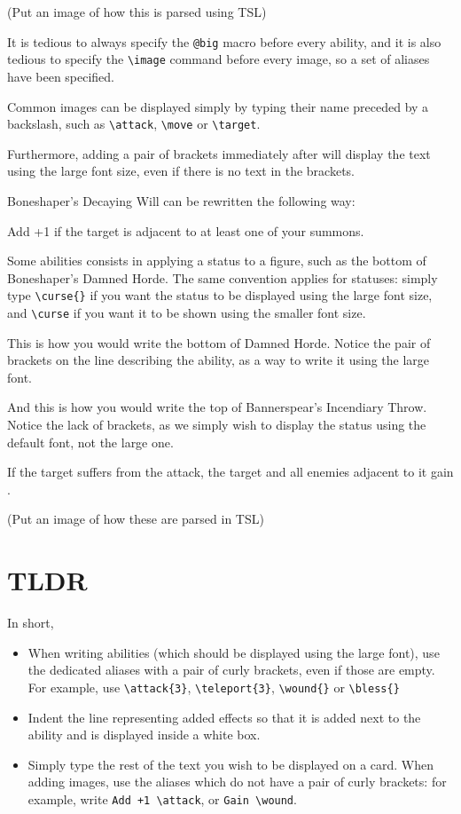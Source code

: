 \documentclass{article}
\begin{document}
(Put an image of how this is parsed using TSL)

It is tedious to always specify the \verb`@big` macro before every ability, and it is also tedious to specify the \verb`\image` command before every image, so a set of aliases have been specified.

Common images can be displayed simply by typing their name preceded by a backslash, such as \verb`\attack`, \verb`\move` or \verb`\target`.

Furthermore, adding a pair of brackets immediately after will display the text using the large font size, even if there is no text in the brackets. 

Boneshaper's Decaying Will can be rewritten the following way:
\begin{spverbatim}
	Add +1 \attack if the target is adjacent to at least one of your summons.
\end{spverbatim}

Some abilities consists in applying a status to a figure, such as the bottom of Boneshaper's Damned Horde. The same convention applies for statuses: simply type \verb`\curse{}` if you want the status to be displayed using the large font size, and \verb`\curse` if you want it to be shown using the smaller font size.

This is how you would write the bottom of Damned Horde. Notice the pair of brackets on the line describing the ability, as a way to write it using the large font.
\begin{spverbatim}
	\curse{}
		 
\end{spverbatim}

And this is how you would write the top of Bannerspear's Incendiary Throw. Notice the lack of brackets, as we simply wish to display the status using the default font, not the large one. 
\begin{spverbatim}
	If the target suffers \damage from the attack, the target and all enemies adjacent to it gain \wound.
\end{spverbatim}

(Put an image of how these are parsed in TSL)

\section{TLDR}
In short,
\begin{itemize}
\item When writing abilities (which should be displayed using the large font), use the dedicated aliases with a pair of curly brackets, even if those are empty. For example, use  \verb`\attack{3}`, \verb`\teleport{3}`, \verb`\wound{}` or \verb`\bless{}`
\item Indent the line representing added effects so that it is added next to the ability and is displayed inside a white box.
\item Simply type the rest of the text you wish to be displayed on a card. When adding images, use the aliases which do not have a pair of curly brackets: for example, write \verb`Add +1 \attack`, or \verb`Gain \wound`.
\end{itemize}
\end{document}
